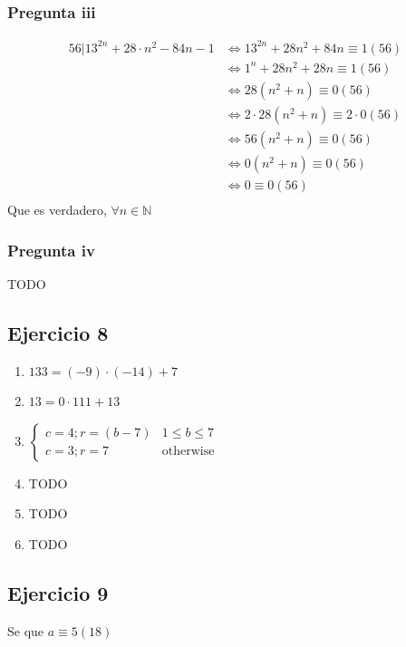 \subsubsection{Pregunta iii}
\begin{align*}
    56 | 13^{2n} + 28 \cdot n^2 - 84n -1 &\iff 13^{2n} + 28n^2 + 84n \equiv 1 (56) \\
    &\iff 1^{n} + 28n^2 + 28n \equiv 1 (56) \\
    &\iff 28(n^2+n)\equiv 0 (56) \\
    &\iff 2\cdot 28(n^2+n)\equiv 2\cdot 0 (56) \\
    &\iff 56(n^2+n)\equiv 0 (56) \\
    &\iff 0(n^2+n)\equiv 0 (56) \\
    &\iff 0\equiv 0 (56) \\
\end{align*}
Que es verdadero, $ \forall n \in \mathbb{N} $

\subsubsection{Pregunta iv}
TODO

\subsection{Ejercicio 8}
\begin{enumerate}
    \item $ 133 = (-9) \cdot (-14) + 7 $ 
    \item $ 13 = 0 \cdot 111 + 13 $ 
    \item $\begin{cases}
        c = 4; r = (b-7) & 1\leq b \leq 7 \\
        c = 3; r = 7 & \text{otherwise} 
    \end{cases}$
    \item TODO
    \item TODO
    \item TODO
\end{enumerate}

\subsection{Ejercicio 9}
Se que $ a \equiv 5 (18) $

